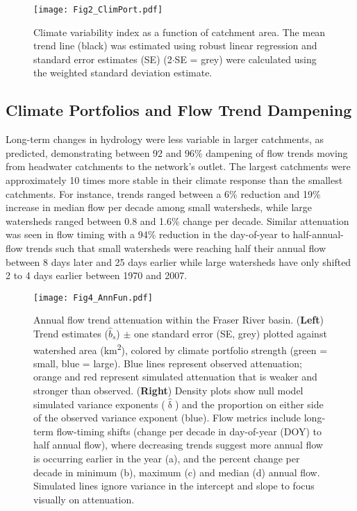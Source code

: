 \documentclass[draft,linenumbers]{AGUJournal}
\begin{document}
\begin{figure}[h]
\centering
\texttt{[image: Fig2\_ClimPort.pdf]}
	\caption{Climate variability index as a function of catchment area. The mean trend line (black) was estimated using robust linear regression and standard error estimates (SE) (2$\cdot$SE = grey) were calculated using the weighted standard deviation estimate.}
\label{fig:2}
\end{figure}

\subsection{Climate Portfolios and Flow Trend Dampening}

Long-term changes in hydrology were less variable in larger catchments, as predicted, demonstrating between 92 and 96\% dampening of flow trends moving from headwater catchments to the network's outlet. The largest catchments were approximately 10 times more stable in their climate response than the smallest catchments. For instance, trends ranged between a 6\% reduction and 19\% increase in median flow per decade among small watersheds, while large watersheds ranged between 0.8 and 1.6\% change per decade. Similar attenuation was seen in flow timing with a 94\% reduction in the day-of-year to half-annual-flow trends such that small watersheds were reaching half their annual flow between 8 days later and 25 days earlier while large watersheds have only shifted 2 to 4 days earlier between 1970 and 2007.

\begin{figure}[h]
\centering
\texttt{[image: Fig4\_AnnFun.pdf]}
	\caption{Annual flow trend attenuation within the Fraser River basin. (\textbf{Left}) Trend estimates ($\hat{b}_{s}$) $\pm$ one standard error (SE, grey) plotted against watershed area (km\textsuperscript{2}), colored by climate portfolio strength (green = small, blue = large). Blue lines represent observed attenuation; orange and red represent simulated attenuation that is weaker and stronger than observed. (\textbf{Right}) Density plots show null model simulated variance exponents ($\hat{\updelta}$) and the proportion on either side of the observed variance exponent (blue). Flow metrics include long-term flow-timing shifts (change per decade in day-of-year (DOY) to half annual flow), where decreasing trends suggest more annual flow is occurring earlier in the year (a), and the percent change per decade in minimum (b), maximum (c) and median (d) annual flow. Simulated lines ignore variance in the intercept and slope to focus visually on attenuation.}
\label{fig:3}
\end{figure}
\end{document}
